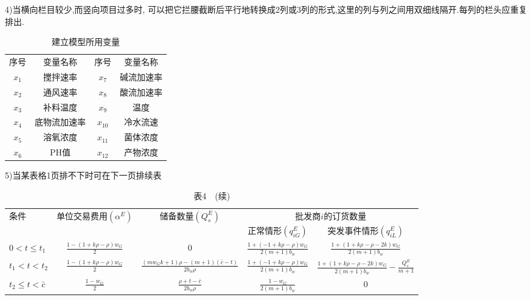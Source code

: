 \documentclass{setp-new}
\begin{document}
4)当横向栏目较少,而竖向项目过多时, 可以把它拦腰截断后平行地转换成2列或3列的形式,这里的列与列之间用双细线隔开.每列的栏头应重复排出.


\begin{table}[H]

\centering
\caption{建立模型所用变量}%
\label{tab1}
	\begin{tabular}{cc||cc}\toprule
			序号  &       变量名称 &       序号 &                 变量名称 \\\hhline{--||--}
			$x_1$  &       搅拌速率   &   $x_7$  &      碱流加速率      \\
			$x_2$  &       通风速率    &   $x_8$  &      酸流加速率      \\
			$x_3$  &       补料温度     &   $x_9$  &       温度\\
			$x_4$  &       底物流加速率 &  ${x_{10}}$  &       冷水流速\\
			$x_5$  &        溶氧浓度    &  ${x_{11}}$  &       菌体浓度\\
			$x_6$  &        PH值              &  ${x_{12}}$  &       产物浓度\\
			\bottomrule
	\end{tabular}
\end{table}




5)当某表格1页排不下时可在下一页排续表
\begin{table}[H]
\centering
\caption*{表4\ \ (续)}%
\begin{tabular}{lcccc} \toprule
     \multirow{2}{*}{条件} & \multirow{2}{*}{单位交易费用$(\alpha^{E})$} &  \multirow{2}{*}{储备数量$(Q_{s}^{E})$} & \multicolumn{2}{c}{批发商$i$的订货数量}  \\\cmidrule(r){4-5}
     &&& 正常情形$(q_{iG}^{E})$ & 突发事件情形$(q_{iL}^{E})$ \\

\hline
  $0<t\leq t_{1}$ & $\frac{1-(1+k\rho-\rho)w_{G}}{2}$ & 0 &$ \frac{1+(-1+k\rho-\rho)w_{G}}{2(m+1)b_{w}} $ &  $\frac{1+(1+k\rho-\rho-2k)w_{G}}{2(m+1)b_{w}}$ \\
 $t_{1}<t<t_{2}$  & $\frac{1-(1+k\rho-\rho)w_{G}}{2}$ & $ \frac{(mw_{G}k+1)\rho-(m+1)(\bar{c}-t)}{2 b_{w}\rho} $  &$ \frac{1+(-1+k\rho-\rho)w_{G}}{2(m+1)b_{w}} $ & $\frac{1+(1+k\rho-\rho-2k)w_{G}}{2(m+1)b_{w}}-\frac{Q_{s}^{E}}{m+1}$  \\
 $t_{2}\leq t<\bar{c}$ & $\frac{1-w_{G}}{2}$ & $\frac{\rho+t-\bar{c}}{2 b_{w}\rho}$ &$ \frac{1-w_{G}}{2(m+1)b_{w}} $ & 0  \\
\bottomrule
\end{tabular}
\end{table}
\end{document}

